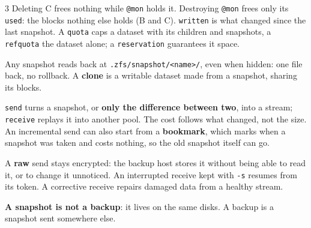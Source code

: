 \documentclass[8pt]{extarticle}
\newcommand\ct[1]{\texttt{#1}}
\newcommand\hd[1]{\par\vspace{4pt}\noindent{\bfseries\color{sheetBlue}#1}\par\vspace{2pt}}
\begin{document}
\begin{multicols}{3}
Deleting C frees nothing while \ct{@mon} holds it. Destroying \ct{@mon} frees only its \ct{used}:
the blocks nothing else holds (B and C). \ct{written} is what changed since the last snapshot.
A \ct{quota} caps a dataset with its children and snapshots, a \ct{refquota} the dataset alone; a
\ct{reservation} guarantees it space.

Any snapshot reads back at \ct{.zfs/snapshot/<name>/}, even when hidden: one file back, no rollback.
A \textbf{clone} is a writable dataset made from a snapshot, sharing its blocks.

\columnbreak

\hd{Send and receive}
\noindent{}\par
\ct{send} turns a snapshot, or \textbf{only the difference between two}, into a stream;
\ct{receive} replays it into another pool. The cost follows what changed, not the size. An
incremental send can also start from a \textbf{bookmark}, which marks when a snapshot was taken and
costs nothing, so the old snapshot itself can go.

A \textbf{raw} send stays encrypted: the backup host stores it without being able to read it, or
to change it unnoticed. An interrupted receive kept with \ct{-s} resumes from its token. A
corrective receive repairs damaged data from a healthy stream.

\textcolor{sheetRed}{\textbf{A snapshot is not a backup}}: it lives on the same disks. A backup is a
snapshot sent somewhere else.

\end{multicols}
\end{document}

